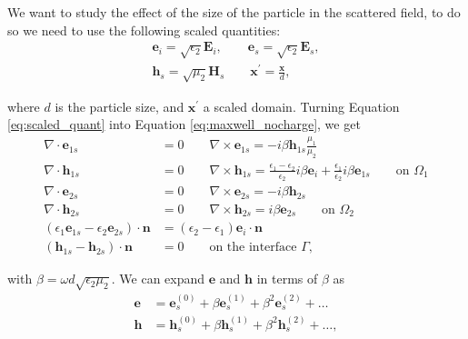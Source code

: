  We want to study the effect of the size of the particle in the scattered field, to do so we need 
 to use the following scaled quantities:
 \begin{align}\label{eq:scaled_quant}
 \mathbf{e}_i = \sqrt{\epsilon_2}\mathbf{E}_i, \qquad \mathbf{e}_s = \sqrt{\epsilon_2}\mathbf{E}_s, \nonumber \\
 \mathbf{h}_s = \sqrt{\mu_2}\mathbf{H}_s \qquad \mathbf{x}^\prime = \frac{\mathbf{x}}{d},
 \end{align}
 
 where $d$ is the particle size, and $\mathbf{x}^\prime$ a scaled domain. Turning
 Equation \eqref{eq:scaled_quant} into Equation \eqref{eq:maxwell_nocharge}, we get
 \begin{align} \label{eq:maxwell_scaled}
 \nabla \cdot \mathbf{e}_{1s} &= 0 \qquad \nabla \times \mathbf{e}_{1s} = -i\beta\mathbf{h}_{1s}\frac{\mu_1}{\mu_2} \nonumber \\
 \nabla \cdot \mathbf{h}_{1s} &= 0 \qquad \nabla \times \mathbf{h}_{1s} = \frac{\epsilon_1-\epsilon_2}{\epsilon_2}i\beta\mathbf{e}_{i}+\frac{\epsilon_1}{\epsilon_2}i\beta\mathbf{e}_{1s}  \qquad \text{on $\Omega_1$} \nonumber \\
 \nabla \cdot \mathbf{e}_{2s} &= 0 \qquad \nabla \times \mathbf{e}_{2s} = -i\beta\mathbf{h}_{2s} \nonumber \\
 \nabla \cdot \mathbf{h}_{2s} &= 0 \qquad \nabla \times \mathbf{h}_{2s} = i\beta\mathbf{e}_{2s} \qquad \text{on $\Omega_2$} \nonumber \\
 (\epsilon_1\mathbf{e}_{1s} - \epsilon_2\mathbf{e}_{2s})\cdot\mathbf{n} &= (\epsilon_2-\epsilon_1)\mathbf{e}_i\cdot \mathbf{n} \nonumber \\(\mathbf{h}_{1s} - \mathbf{h}_{2s})\cdot \mathbf{n}&=0 \qquad \text{on the interface $\Gamma$,}
 \end{align}
 
 with $\beta=\omega d \sqrt{\epsilon_2\mu_2}$. We can expand $\mathbf{e}$ and $\mathbf{h}$ in 
 terms of $\beta$ as
 \begin{align} \label{eq:expand}
 \mathbf{e} &= \mathbf{e}_s^{(0)} + \beta \mathbf{e}_s^{(1)} + \beta^2 \mathbf{e}_s^{(2)} + \ldots \nonumber\\
 \mathbf{h} &= \mathbf{h}_s^{(0)} + \beta \mathbf{h}_s^{(1)} + \beta^2 \mathbf{h}_s^{(2)} + \ldots,
 \end{align}
 
